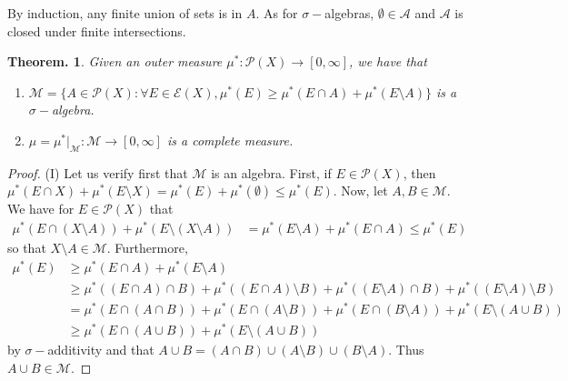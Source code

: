 \documentclass[11pt, a4paper]{memoir}
\theoremstyle{change}
\newtheorem{theorem}{Theorem.}[section]
\theoremstyle{plain}
\theoremstyle{nonumberplain}
\newtheorem{proof}{Proof}
\begin{document}
By induction, any finite union of sets is in $A$.
As for $\sigma-$algebras, $\emptyset\in\mathcal{A}$ and $\mathcal{A}$ is closed under finite intersections.
\begin{theorem}
    Given an outer measure $\mu^*:\mathcal{P}(X)\to[0,\infty]$, we have that
    \begin{enumerate}[nolistsep,label={(\roman*)}]
        \item $\mathcal{M}=\{A\in\mathcal{P}(X):\forall E\in\mathcal{E}(X),\mu^*(E)\geq\mu^*(E\cap A)+\mu^*(E\setminus A)\}$ is a $\sigma-$algebra.
        \item $\mu=\mu^*|_{\mathcal{M}}:\mathcal{M}\to[0,\infty]$ is a complete measure.
    \end{enumerate}
\end{theorem}
\begin{proof}
    (I) Let us verify first that $\mathcal{M}$ is an algebra.
    First, if $E\in\mathcal{P}(X)$, then $\mu^*(E\cap X)+\mu^*(E\setminus X)=\mu^*(E)+\mu^*(\emptyset)\leq \mu^*(E)$.
    Now, let $A,B\in\mathcal{M}$.
    We have for $E\in\mathcal{P}(X)$ that
    \begin{align*}
        \mu^*(E\cap(X\setminus A))+\mu^*(E\setminus(X\setminus A)) &= \mu^*(E\setminus A)+\mu^*(E\cap A)\leq\mu^*(E)
    \end{align*}
    so that $X\setminus A\in\mathcal{M}$.
    Furthermore,
    \begin{align*}
        \mu^*(E) &\geq \mu^*(E\cap A)+\mu^*(E\setminus A)\\
                 &\geq \mu^*((E\cap A)\cap B)+\mu^*((E\cap A)\setminus B)+\mu^*((E\setminus A)\cap B)+\mu^*((E\setminus A)\setminus B)\\
                 &= \mu^*(E\cap(A\cap B))+\mu^*(E\cap(A\setminus B))+\mu^*(E\cap(B\setminus A))+\mu^*(E\setminus(A\cup B))\\
                 &\geq \mu^*(E\cap(A\cup B))+\mu^*(E\setminus(A\cup B))
    \end{align*}
    by $\sigma-$additivity and that $A\cup B=(A\cap B)\cup(A\setminus B)\cup(B\setminus A)$.
    Thus $A\cup B\in\mathcal{M}$.


\end{proof}
\end{document}
